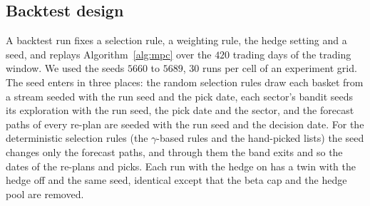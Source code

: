 \subsection{Backtest design}\label{sec:method-backtest}

A backtest run fixes a selection rule, a weighting rule, the hedge setting and a seed, and replays
Algorithm~\ref{alg:mpc} over the $420$ trading days of the trading window. We used the seeds $5660$ to $5689$, $30$
runs per cell of an experiment grid. The seed enters in three places: the random selection rules draw each basket
from a stream seeded with the run seed and the pick date, each sector's bandit seeds its exploration with the run
seed, the pick date and the sector, and the forecast paths of every re-plan are seeded with the run seed and the
decision date. For the deterministic selection rules (the $\gamma$-based rules and the hand-picked lists) the seed
changes only the forecast paths, and through them the band exits and so the dates of the re-plans and picks. Each
run with the hedge on has a twin with the hedge off and the same seed, identical except that the beta cap and the
hedge pool are removed.

